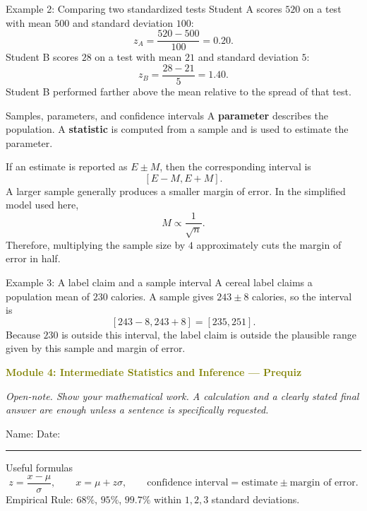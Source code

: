 \documentclass[11pt]{article}
\newcommand{\prequizhead}[2]{%
  \clearpage
  {\Large\bfseries\textcolor{olive}{Module #1: #2 — Prequiz}}\par
  \textit{Open-note. Show your mathematical work. A calculation and a clearly stated final answer are enough unless a sentence is specifically requested.}\par
  Name: \hspace{2.6in} Date: \hspace{1.1in}\par
  \vspace{2pt}\textcolor{gold}{\rule{\linewidth}{1.2pt}}\par\smallskip
}
\begin{document}
\begin{examplebox}{Example 2: Comparing two standardized tests}
Student A scores \(520\) on a test with mean \(500\) and standard deviation \(100\):
\[
z_A=\frac{520-500}{100}=0.20.
\]
Student B scores \(28\) on a test with mean \(21\) and standard deviation \(5\):
\[
z_B=\frac{28-21}{5}=1.40.
\]
Student B performed farther above the mean relative to the spread of that test.
\end{examplebox}

\begin{keybox}{Samples, parameters, and confidence intervals}
A \textbf{parameter} describes the population. A \textbf{statistic} is computed from a sample and is used to estimate the parameter.

If an estimate is reported as \(E\pm M\), then the corresponding interval is
\[
[E-M,E+M].
\]
A larger sample generally produces a smaller margin of error. In the simplified model used here,
\[
M\propto \frac1{\sqrt n}.
\]
Therefore, multiplying the sample size by \(4\) approximately cuts the margin of error in half.
\end{keybox}

\begin{examplebox}{Example 3: A label claim and a sample interval}
A cereal label claims a population mean of \(230\) calories. A sample gives \(243\pm8\) calories, so the interval is
\[
[243-8,243+8]=[235,251].
\]
Because \(230\) is outside this interval, the label claim is outside the plausible range given by this sample and margin of error.
\end{examplebox}

\prequizhead{4}{Intermediate Statistics and Inference}
\begin{refbox}{Useful formulas}
\[
z=\frac{x-\mu}{\sigma},
\qquad
x=\mu+z\sigma,
\qquad
\text{confidence interval}=\text{estimate}\pm\text{margin of error}.
\]
Empirical Rule: \(68\%\), \(95\%\), \(99.7\%\) within \(1,2,3\) standard deviations.
\end{refbox}
\end{document}
